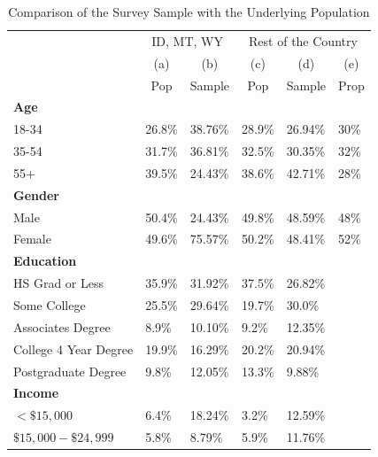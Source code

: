 \documentclass[english,12pt]{article}
\begin{document}
\begin{table}[htbp]
    \centering
    \caption{Comparison of the Survey Sample with the Underlying Population}
    \begin{tabular}{@{}llllll@{}}
        \toprule
        	&\multicolumn{2}{c}{ID, MT, WY} & \multicolumn{3}{c}{Rest of the Country}\\
            &\multicolumn{1}{c}{(a)}   &\multicolumn{1}{c}{(b)}   &\multicolumn{1}{c}{(c)} &\multicolumn{1}{c}{(d)} &\multicolumn{1}{c}{(e)} \\
                           & \multicolumn{1}{c}{Pop}     & \multicolumn{1}{c}{Sample}     & \multicolumn{1}{c}{Pop}      & \multicolumn{1}{c}{Sample} & \multicolumn{1}{c}{Prop}   \\ \midrule
	\textbf{Age}		   & &  &   &   &       \\
    18-34				   & 26.8\%   & 38.76\%      & 28.9\%   & 26.94\% & 30\%  \\
    35-54				   & 31.7\%   & 36.81\%      & 32.5\%   & 30.35\% & 32\%  \\
    55+      			   & 39.5\%   & 24.43\%      & 38.6\%    & 42.71\% & 28\% \\ \midrule
    \textbf{Gender}		   &		  &              &           &                \\
    Male     			   & 50.4\%   & 24.43\%      & 49.8\%    & 48.59\% & 48\% \\
    Female				   & 49.6\%   & 75.57\%      & 50.2\%    & 48.41\% & 52\% \\\midrule
    \textbf{Education}	   &		  &              &           &                \\
    HS Grad or Less        & 35.9\%   & 31.92\%      & 37.5\%    & 26.82\% &      \\
    Some College		   & 25.5\%   & 29.64\%      & 19.7\%    & 30.0\%  &      \\
    Associates Degree      & 8.9\%    & 10.10\%      & 9.2\%     & 12.35\% &      \\
    College 4 Year Degree  & 19.9\%   & 16.29\%      & 20.2\%    & 20.94\% &      \\
    Postgraduate Degree    & 9.8\%    & 12.05\%      & 13.3\%    & 9.88\%  &      \\\midrule
    \textbf{Income}	       &		  &              &           &         &      \\
    $<\$15,000$            & 6.4\%     & 18.24\%      & 3.2\%     & 12.59\% &      \\
    $\$15,000 - \$24,999$  & 5.8\%     & 8.79\%       & 5.9\%     & 11.76\% &      \\

\end{tabular}
\end{table}
\end{document}
